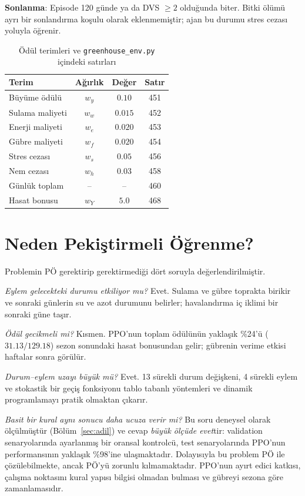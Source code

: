 \documentclass[conference,a4paper]{IEEEtran}
\newcommand{\cfg}[1]{\texttt{#1}}
\begin{document}
\textbf{Sonlanma}: Episode 120 günde ya da DVS $\geq2$ olduğunda biter. Bitki ölümü ayrı bir sonlandırma koşulu olarak eklenmemiştir; ajan bu durumu stres cezası yoluyla öğrenir.

\begin{table}[!t]
\caption{Ödül terimleri ve \cfg{greenhouse\_env.py} içindeki satırları}
\label{tab:odul}
\centering
\footnotesize
\begin{tabular}{@{}lccc@{}}
\toprule
Terim & Ağırlık & Değer & Satır\\
\midrule
Büyüme ödülü & $w_y$ & $0.10$ & 451\\
Sulama maliyeti & $w_w$ & $0.015$ & 452\\
Enerji maliyeti & $w_e$ & $0.020$ & 453\\
Gübre maliyeti & $w_f$ & $0.020$ & 454\\
Stres cezası & $w_s$ & $0.05$ & 456\\
Nem cezası & $w_h$ & $0.03$ & 458\\
Günlük toplam & -- & -- & 460\\
Hasat bonusu & $w_Y$ & $5.0$ & 468\\
\bottomrule
\end{tabular}
\end{table}

\section{Neden Pekiştirmeli Öğrenme?}
\label{sec:nedenrl}
Problemin PÖ gerektirip gerektirmediği dört soruyla değerlendirilmiştir.

\textit{Eylem gelecekteki durumu etkiliyor mu?} Evet. Sulama ve gübre toprakta birikir ve sonraki günlerin su ve azot durumunu belirler; havalandırma iç iklimi bir sonraki güne taşır.

\textit{Ödül gecikmeli mi?} Kısmen. PPO'nun toplam ödülünün yaklaşık \%24'ü ($31.13/129.18$) sezon sonundaki hasat bonusundan gelir; gübrenin verime etkisi haftalar sonra görülür.

\textit{Durum--eylem uzayı büyük mü?} Evet. 13 sürekli durum değişkeni, 4 sürekli eylem ve stokastik bir geçiş fonksiyonu tablo tabanlı yöntemleri ve dinamik programlamayı pratik olmaktan çıkarır.

\textit{Basit bir kural aynı sonucu daha ucuza verir mi?} Bu soru deneysel olarak ölçülmüştür (Bölüm~\ref{sec:adil}) ve cevap \emph{büyük ölçüde evet}tir: validation senaryolarında ayarlanmış bir oransal kontrolcü, test senaryolarında PPO'nun performansının yaklaşık \%98'ine ulaşmaktadır. Dolayısıyla bu problem PÖ ile çözülebilmekte, ancak PÖ'yü zorunlu kılmamaktadır. PPO'nun ayırt edici katkısı, çalışma noktasını kural yapısı bilgisi olmadan bulması ve gübreyi sezona göre zamanlamasıdır.
\end{document}
